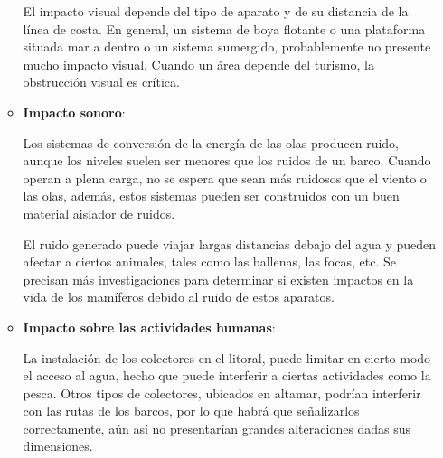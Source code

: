 \begin{enumerate}
\begin{itemize}
    El impacto visual depende del tipo de aparato y de su distancia de
    la línea de costa. En general, un sistema de boya flotante o una
    plataforma situada mar a dentro o un sistema sumergido,
    probablemente no presente mucho impacto visual. Cuando un área
    depende del turismo, la obstrucción visual es crítica.
  \item
    \textbf{Impacto sonoro}:

    Los sistemas de conversión de la energía de las olas producen ruido,
    aunque los niveles suelen ser menores que los ruidos de un barco.
    Cuando operan a plena carga, no se espera que sean más ruidosos que
    el viento o las olas, además, estos sistemas pueden ser construidos
    con un buen material aislador de ruidos.

    El ruido generado puede viajar largas distancias debajo del agua y
    pueden afectar a ciertos animales, tales como las ballenas, las
    focas, etc. Se precisan más investigaciones para determinar si
    existen impactos en la vida de los mamíferos debido al ruido de
    estos aparatos.
  \item
    \textbf{Impacto sobre las actividades humanas}:

    La instalación de los colectores en el litoral, puede limitar en
    cierto modo el acceso al agua, hecho que puede interferir a ciertas
    actividades como la pesca. Otros tipos de colectores, ubicados en
    altamar, podrían interferir con las rutas de los barcos, por lo que
    habrá que señalizarlos correctamente, aún así no presentarían
    grandes alteraciones dadas sus dimensiones.
  \end{itemize}
\end{enumerate}
